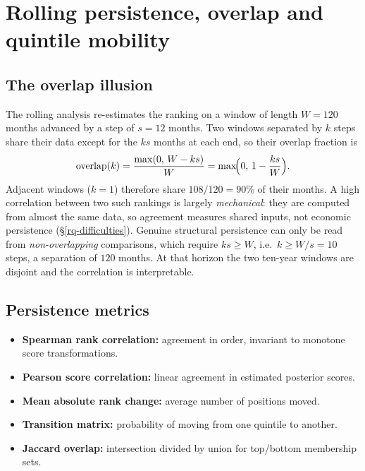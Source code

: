 \hypertarget{persistence}{}
\hypertarget{rolling-persistence-overlap-and-quintile-mobility}{%
\chapter{Rolling persistence, overlap and quintile
mobility}\label{rolling-persistence-overlap-and-quintile-mobility}}

\hypertarget{the-overlap-illusion}{%
\section{The overlap illusion}\label{the-overlap-illusion}}

The rolling analysis re-estimates the ranking on a window of length
$W=120$ months advanced by a step of $s=12$ months. Two windows separated
by $k$ steps share their data except for the $ks$ months at each end, so
their overlap fraction is
\begin{equation}\label{eq:ch10-overlap}
\text{overlap}(k) = \frac{\max(0,\,W-ks)}{W} = \max\!\Bigl(0,\,1-\frac{ks}{W}\Bigr).
\end{equation}
Adjacent windows ($k=1$) therefore share $108/120=90\%$ of their months.
A high correlation between two such rankings is largely \emph{mechanical}:
they are computed from almost the same data, so agreement measures shared
inputs, not economic persistence (\S\ref{rq-difficulties}). Genuine
structural persistence can only be read from \emph{non-overlapping}
comparisons, which require $ks\ge W$, i.e.\ $k\ge W/s=10$ steps, a
separation of $120$ months. At that horizon the two ten-year windows are
disjoint and the correlation is interpretable.

\hypertarget{persistence-metrics}{%
\section{Persistence metrics}\label{persistence-metrics}}

\begin{itemize}
\tightlist
\item
  \textbf{Spearman rank correlation:} agreement in order, invariant to
  monotone score transformations.
\item
  \textbf{Pearson score correlation:} linear agreement in estimated
  posterior scores.
\item
  \textbf{Mean absolute rank change:} average number of positions moved.
\item
  \textbf{Transition matrix:} probability of moving from one quintile to
  another.
\item
  \textbf{Jaccard overlap:} intersection divided by union for top/bottom
  membership sets.
\end{itemize}

